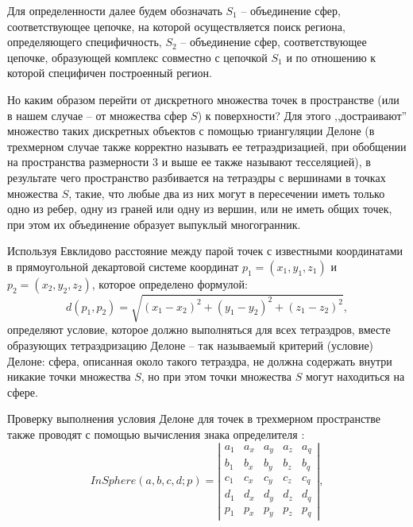 Для определенности далее будем обозначать $S_1$ -- объединение сфер, соответствующее цепочке, на которой осуществляется поиск региона, определяющего специфичность, $S_2$ -- объединение сфер, соответствующее цепочке, образующей комплекс совместно с цепочкой $S_1$ и по отношению к которой специфичен построенный регион. 

Но каким образом перейти от дискретного множества точек в пространстве (или в нашем случае -- от множества сфер $S$) к поверхности? Для этого ,,достраивают'' множество таких дискретных объектов с помощью триангуляции Делоне (в трехмерном случае также  корректно называть ее тетраэдризацией, при обобщении на пространства размерности 3 и выше ее также называют тесселяцией), в результате чего пространство разбивается на тетраэдры с вершинами в точках множества $S$, такие, что любые два из них могут в пересечении иметь только одно из ребер, одну из граней или одну из вершин, или не иметь общих точек, при этом их объединение образует выпуклый многогранник.



Используя Евклидово расстояние между парой точек с известными координатами в прямоугольной декартовой системе координат $p_1=(x_1, y_1, z_1)$ и $p_2=(x_2, y_2, z_2)$, которое определено формулой:
$$d(p_1, p_2) =\sqrt{(x_1-x_2)^2+(y_1-y_2)^2+(z_1-z_2)^2}, $$ 
определяют условие, которое должно выполняться для всех тетраэдров, вместе образующих тетраэдризацию Делоне -- так называемый критерий (условие) Делоне: сфера, описанная около такого тетраэдра, не должна содержать внутри никакие точки множества $S$, но при этом точки множества $S$ могут находиться на сфере.

Проверку выполнения условия Делоне для точек в трехмерном пространстве также проводят с помощью вычисления знака определителя \cite{delaunay_tesselations}:
\begin{equation}
InSphere(a, b, c, d; p) = \left|
\begin{array}{ccccc}
a_1 & a_x & a_y & a_z & a_q \\ 
b_1 & b_x & b_y & b_z & b_q  \\ 
c_1 & c_x & c_y & c_z & c_q \\ 
d_1 & d_x & d_y & d_z & d_q \\ 
p_1 & p_x & p_y & p_z & p_q 
\end{array} \right|,\label{ch2:det}
\end{equation}
 
